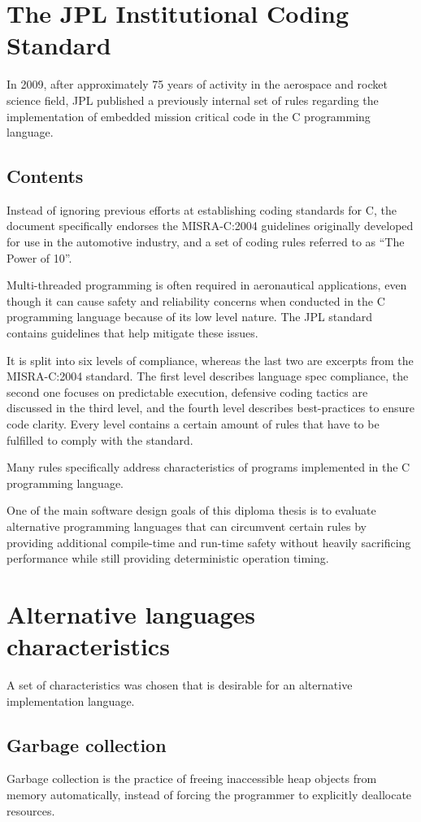 \section{The JPL Institutional Coding Standard}
In 2009, after approximately 75 years of activity in the aerospace and rocket science field, JPL published a previously internal set of rules regarding the implementation of embedded mission critical code in the C programming language. 

\subsection{Contents}
Instead of ignoring previous efforts at establishing coding standards for C, the document specifically endorses the MISRA-C:2004 guidelines originally developed for use in the automotive industry, and a set of coding rules referred to as “The Power of 10”. 

Multi-threaded programming is often required in aeronautical applications, even though it can cause safety and reliability concerns when conducted in the C programming language because of its low level nature. The JPL standard contains guidelines that help mitigate these issues.

It is split into six levels of compliance, whereas the last two are excerpts from the MISRA-C:2004 standard. The first level describes language spec compliance, the second one focuses on predictable execution, defensive coding tactics are discussed in the third level, and the fourth level describes best-practices to ensure code clarity. Every level contains a certain amount of rules that have to be fulfilled to comply with the standard.

Many rules specifically address characteristics of programs implemented in the C programming language.

One of the main software design goals of this diploma thesis is to evaluate alternative programming languages that can circumvent certain rules by providing additional compile-time and run-time safety without heavily sacrificing performance while still providing deterministic operation timing.

\section{Alternative languages characteristics}
A set of characteristics was chosen that is desirable for an alternative implementation language. 

\subsection{Garbage collection}
Garbage collection is the practice of freeing inaccessible heap objects from memory automatically, instead of forcing the programmer to explicitly deallocate resources.

